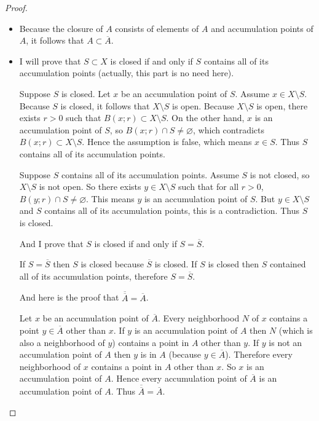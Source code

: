 \begin{proof}
    \begin{itemize}
        \item Because the closure of $A$ consists of elements of $A$ and accumulation points of $A$, it follows that $A\subset \overline{A}$.
        \item I will prove that $S\subset X$ is closed if and only if $S$ contains all of its accumulation points (actually, this part is no need here).

              Suppose $S$ is closed. Let $x$ be an accumulation point of $S$. Assume $x\in X\setminus S$. Because $S$ is closed, it follows that $X\setminus S$ is open. Because $X\setminus S$ is open, there exists $r > 0$ such that $B(x; r)\subset X\setminus S$. On the other hand, $x$ is an accumulation point of $S$, so $B(x; r)\cap S \ne \varnothing$, which contradicts $B(x; r)\subset X\setminus S$. Hence the assumption is false, which means $x\in S$. Thus $S$ contains all of its accumulation points.

              Suppose $S$ contains all of its accumulation points. Assume $S$ is not closed, so $X\setminus S$ is not open. So there exists $y\in X\setminus S$ such that for all $r > 0$, $B(y; r)\cap S\ne \varnothing$. This means $y$ is an accumulation point of $S$. But $y\in X\setminus S$ and $S$ contains all of its accumulation points, this is a contradiction. Thus $S$ is closed.

              And I prove that $S$ is closed if and only if $S = \overline{S}$.

              If $S = \overline{S}$ then $S$ is closed because $\overline{S}$ is closed. If $S$ is closed then $S$ contained all of its accumulation points, therefore $S = \overline{S}$.

              And here is the proof that $\overline{\overline{A}} = \overline{A}$.

              Let $x$ be an accumulation point of $\overline{A}$. Every neighborhood $N$ of $x$ contains a point $y\in\overline{A}$ other than $x$. If $y$ is an accumulation point of $A$ then $N$ (which is also a neighborhood of $y$) contains a point in $A$ other than $y$. If $y$ is not an accumulation point of $A$ then $y$ is in $A$ (because $y\in\overline{A}$). Therefore every neighborhood of $x$ contains a point in $A$ other than $x$. So $x$ is an accumulation point of $A$. Hence every accumulation point of $\overline{A}$ is an accumulation point of $A$. Thus $\overline{\overline{A}} = \overline{A}$.


\end{itemize}
\end{proof}
